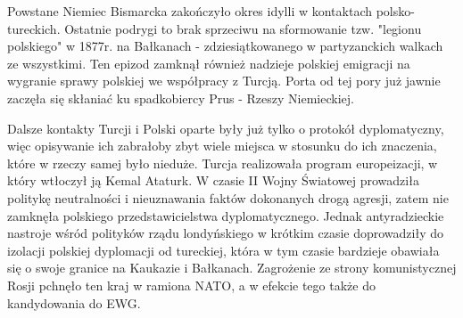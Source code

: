 Powstane Niemiec Bismarcka zakończyło okres idylli w kontaktach polsko-tureckich. Ostatnie podrygi to brak sprzeciwu na sformowanie tzw. "legionu polskiego" w 1877r. na Bałkanach - zdziesiątkowanego w partyzanckich walkach ze wszystkimi. Ten epizod zamknął również nadzieje polskiej emigracji na wygranie sprawy polskiej we współpracy z Turcją. Porta od tej pory już jawnie zaczęła się skłaniać ku spadkobiercy Prus - Rzeszy Niemieckiej.

Dalsze kontakty Turcji i Polski oparte były już tylko o protokół dyplomatyczny, więc opisywanie ich zabrałoby zbyt wiele miejsca w stosunku do ich znaczenia, które w rzeczy samej było nieduże. Turcja realizowała program europeizacji, w który wtłoczył ją Kemal Ataturk. W czasie II Wojny Światowej prowadziła politykę neutralności i nieuznawania faktów dokonanych drogą agresji, zatem nie zamknęła polskiego przedstawicielstwa dyplomatycznego. Jednak antyradzieckie nastroje wśród polityków rządu londyńskiego w krótkim czasie doprowadziły do izolacji polskiej dyplomacji od tureckiej, która w tym czasie bardzieje obawiała się o swoje granice na Kaukazie i Bałkanach. Zagrożenie ze strony komunistycznej Rosji pchnęło ten kraj w ramiona NATO, a w efekcie tego także do kandydowania do EWG.



